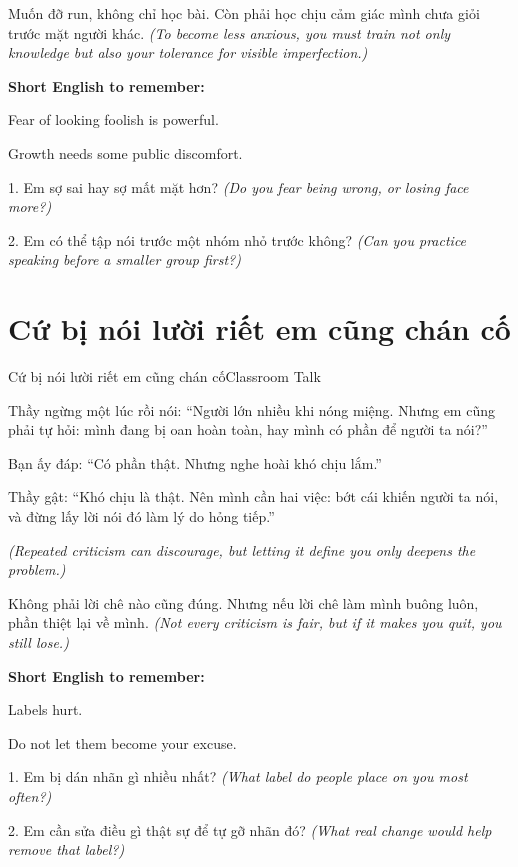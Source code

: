 \begin{baihoc}
Muốn đỡ run, không chỉ học bài. Còn phải học chịu cảm giác mình chưa giỏi trước mặt người khác.
\textit{(To become less anxious, you must train not only knowledge but also your tolerance for visible imperfection.)}
\end{baihoc}

\begin{ghinhoanh}
\textbf{Short English to remember:}

Fear of looking foolish is powerful.

Growth needs some public discomfort.
\end{ghinhoanh}

\begin{tuhocnhanh}
1. Em sợ sai hay sợ mất mặt hơn? \textit{(Do you fear being wrong, or losing face more?)}

2. Em có thể tập nói trước một nhóm nhỏ trước không? \textit{(Can you practice speaking before a smaller group first?)}
\end{tuhocnhanh}
\ngancach

\section{Cứ bị nói lười riết em cũng chán cố}
\begin{truyen}{Cứ bị nói lười riết em cũng chán cố}{Classroom Talk}

Thầy ngừng một lúc rồi nói: ``Người lớn nhiều khi nóng miệng. Nhưng em cũng phải tự hỏi: mình đang bị oan hoàn toàn, hay mình có phần để người ta nói?''

Bạn ấy đáp: ``Có phần thật. Nhưng nghe hoài khó chịu lắm.''

Thầy gật: ``Khó chịu là thật. Nên mình cần hai việc: bớt cái khiến người ta nói, và đừng lấy lời nói đó làm lý do hỏng tiếp.''

\textit{(Repeated criticism can discourage, but letting it define you only deepens the problem.)}
\end{truyen}

\begin{baihoc}
Không phải lời chê nào cũng đúng. Nhưng nếu lời chê làm mình buông luôn, phần thiệt lại về mình.
\textit{(Not every criticism is fair, but if it makes you quit, you still lose.)}
\end{baihoc}

\begin{ghinhoanh}
\textbf{Short English to remember:}

Labels hurt.

Do not let them become your excuse.
\end{ghinhoanh}

\begin{tuhocnhanh}
1. Em bị dán nhãn gì nhiều nhất? \textit{(What label do people place on you most often?)}

2. Em cần sửa điều gì thật sự để tự gỡ nhãn đó? \textit{(What real change would help remove that label?)}
\end{tuhocnhanh}
\ngancach